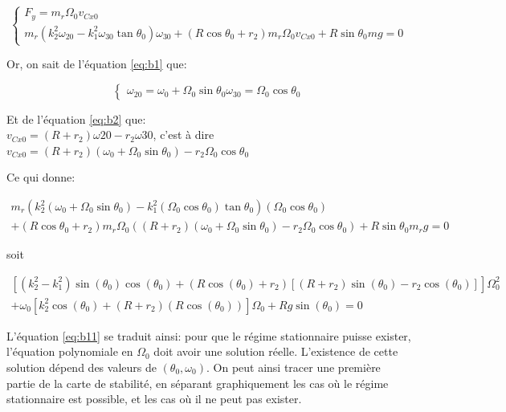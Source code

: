 \begin{equation}
  \begin{cases}
    F_y=m_r \Omega_0 v_{Cx0} \\
    m_r(k_2^2\omega_{20}-k_1^2\omega_{30} \tan{\theta_0})\omega_{30} +(R\cos{\theta_0}+r_2)m_r \Omega_0 v_{Cx0} + R\sin{\theta_0}mg =0
  \end{cases}
  \label{eq:b9}
\end{equation}

Or, on sait de l'équation \ref{eq:b1} que:

\begin{equation}
  \begin{cases}
    \omega_{20}=\omega_0 + \Omega_0 \sin{\theta_0}
    \omega_{30}=\Omega_0 \cos{\theta_0}
  \end{cases}
  \label{eq:b10}
\end{equation}

Et de l'équation \ref{eq:b2} que:\\
$v_{Cx0}=(R+r_2)\omega{20}-r_2\omega{30}$, c'est à dire $v_{Cx0}=(R+r_2)(\omega_0 + \Omega_0 \sin{\theta_0})-r_2\Omega_0 \cos{\theta_0}$

Ce qui donne:

\begin{equation}
 \begin{split}
     m_r(k_2^2(\omega_0 + \Omega_0 \sin{\theta_0})-k_1^2(\Omega_0 \cos{\theta_0}) \tan{\theta_0})(\Omega_0 \cos{\theta_0})\\
    +(R\cos{\theta_0}+r_2)m_r \Omega_0 ((R+r_2)(\omega_0 + \Omega_0 \sin{\theta_0})-r_2\Omega_0 \cos{\theta_0}) + R\sin{\theta_0}m_r g =0
 \end{split}
  \label{eq:b11}
\end{equation}

soit

\begin{equation}
 \begin{split}
     [(k_2^2-k_1^2)\sin(\theta_0)\cos(\theta_0)+(R \cos(\theta_0)+r_2)[(R+r_2)\sin(\theta_0)-r_2 \cos(\theta_0)]]\Omega_0^2 \\
     +\omega_0[k_2^2 \cos(\theta_0)+(R+r_2)(R \cos(\theta_0))] \Omega_0 + R g \sin(\theta_0) =0
 \end{split}
  \label{eq:b12}
\end{equation}

L'équation \ref{eq:b11} se traduit ainsi: pour que le régime stationnaire puisse exister, l'équation polynomiale en $\Omega_0$ doit avoir une solution réelle. L'existence de cette solution dépend des valeurs de $(\theta_0,\omega_0)$. On peut ainsi tracer une première partie de la carte de stabilité, en séparant graphiquement les cas où le régime stationnaire est possible, et les cas où il ne peut pas exister.


